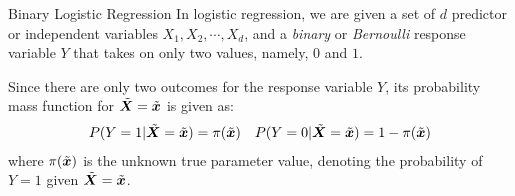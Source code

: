 
\date{Chapter 24: Logistic Regression}

\begin{frame}
\titlepage
\end{frame}

%
%
\begin{frame}{Binary Logistic Regression}
In logistic regression, we are given a set of $d$ 
predictor or independent variables $X_1, X_2, \cdots, X_d$, 
and a {\em binary} or {\em Bernoulli} response variable $Y$ 
that takes on only two values, namely, $0$ and $1$. 

\medskip

Since there are only two outcomes for the response variable $Y$, its 
probability mass function for $\tilde{{\boldsymbol X}}=\tilde{{\boldsymbol x}}$ is given as:
\begin{align*}
    P(Y=1 | \tilde{{\boldsymbol X}}=\tilde{{\boldsymbol x}}) & = \pi(\tilde{{\boldsymbol x}}) & P(Y=0 | \tilde{{\boldsymbol X}}=\tilde{{\boldsymbol x}}) = 1 - \pi(\tilde{{\boldsymbol x}})
\end{align*}
where $\pi(\tilde{{\boldsymbol x}})$ is the unknown true parameter value, 
denoting the probability of $Y=1$ given $\tilde{{\boldsymbol X}}=\tilde{{\boldsymbol x}}$. 

\end{frame}



